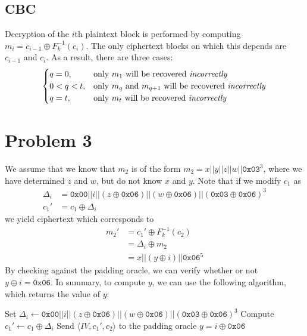 \documentclass[12pt]{article}
\numberwithin{equation}{section}
\theoremstyle{plain}
\newcommand{\set}[1]{\{ #1 \}}
\begin{document}
\subsection*{CBC}

Decryption of the $i$th plaintext block is performed by computing $m_i = c_{i-1} \oplus F_k^{-1}(c_i)$.
The only ciphertext blocks on which this depends are $c_{i-1}$ and $c_i$.
As a result, there are three cases:
\begin{equation*}
\begin{cases}
q = 0, &\text{only }m_1\text{ will be recovered \textit{incorrectly}}\\
0 < q < t, &\text{only }m_q\text{ and }m_{q+1}\text{ will be recovered \textit{incorrectly}}\\
q = t, &\text{only }m_t\text{ will be recovered \textit{incorrectly}}
\end{cases}
\end{equation*}

\section*{Problem 3}

We assume that we know that $m_2$ is of the form $m_2 = x || y || z || w || \texttt{0x03}^3$,
where we have determined $z$ and $w$, but do not know $x$ and $y$.
Note that if we modify $c_1$ as
\begin{align*}
\Delta_i
    &= \texttt{0x00} || i || (z \oplus \texttt{0x06}) || (w \oplus \texttt{0x06}) || (\texttt{0x03} \oplus \texttt{0x06})^3\\
c_1'
    &= c_1 \oplus \Delta_i
\end{align*}
we yield ciphertext which corresponds to
\begin{align*}
m_2'
    &= c_1' \oplus F_k^{-1}(c_2)\\
    &= \Delta_i \oplus m_2\\
    &= x || (y \oplus i) || \texttt{0x06}^5
\end{align*}
By checking against the padding oracle,
we can verify whether or not $y \oplus i = \texttt{0x06}$.
In summary,
to compute $y$, we can use the following algorithm, which returns the value of $y$:
\begin{algorithm}[H]
\begin{algorithmic}
    \For{$i \in \set{ 0, 1 }^8$}
        \State Set $\Delta_i \gets \texttt{0x00} || i || (z \oplus \texttt{0x06}) || (w \oplus \texttt{0x06}) || (\texttt{0x03} \oplus \texttt{0x06})^3$
        \State Compute $c_1' \gets c_1 \oplus \Delta_i$
        \State Send $\langle IV, c_1', c_2 \rangle$ to the padding oracle
            \State \Return $y = i \oplus \texttt{0x06}$
        \EndIf
    \EndFor
\EndProcedure
\end{algorithmic}
\end{algorithm}
\end{document}
